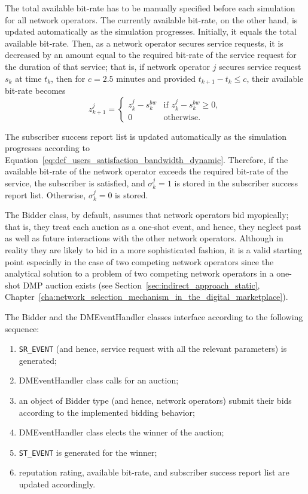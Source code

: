 The total available bit-rate has to be manually specified before each simulation for all network operators. The currently available bit-rate, on the other hand, is updated automatically as the simulation progresses. Initially, it equals the total available bit-rate. Then, as a network operator secures service requests, it is decreased by an amount equal to the required bit-rate of the service request for the duration of that service; that is, if network operator $j$ secures service request $s_k$ at time $t_k$, then for $c=2.5$ minutes and provided $t_{k+1}-t_k\le c$, their available bit-rate becomes
\begin{equation*}
	z^j_{k+1} =
	\left\{
	\begin{array}{ll}
		z^j_k - s^{bw}_k &\text{if } z^j_k - s^{bw}_k\ge 0, \\
		0 &\text{otherwise}.
	\end{array}
	\right.
\end{equation*}

The subscriber success report list is updated automatically as the simulation progresses according to Equation~\eqref{eq:def_users_satisfaction_bandwidth_dynamic}. Therefore, if the available bit-rate of the network operator exceeds the required bit-rate of the service, the subscriber is satisfied, and $\sigma_k^j = 1$ is stored in the subscriber success report list. Otherwise, $\sigma_k^j = 0$ is stored.

The Bidder class, by default, assumes that network operators bid myopically; that is, they treat each auction as a one-shot event, and hence, they neglect past as well as future interactions with the other network operators. Although in reality they are likely to bid in a more sophisticated fashion, it is a valid starting point especially in the case of two competing network operators since the analytical solution to a problem of two competing network operators in a one-shot DMP auction exists (see Section~\ref{sec:indirect_approach_static}, Chapter~\ref{cha:network_selection_mechanism_in_the_digital_marketplace}). 

The Bidder and the DMEventHandler classes interface according to the following sequence:
\begin{enumerate}
	\item \lstinline{SR_EVENT} (and hence, service request with all the relevant parameters) is generated;
	\item DMEventHandler class calls for an auction;
	\item an object of Bidder type (and hence, network operators) submit their bids according to the implemented bidding behavior;
	\item DMEventHandler class elects the winner of the auction;
	\item \lstinline{ST_EVENT} is generated for the winner;
	\item reputation rating, available bit-rate, and subscriber success report list are updated accordingly.
\end{enumerate}

